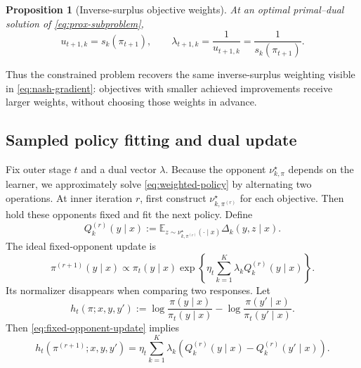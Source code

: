 \documentclass{article}
\newtheorem{proposition}{Proposition}
\theoremstyle{remark}
\theoremstyle{plain}
\newcommand{\E}{\mathbb{E}}
\begin{document}
\begin{proposition}[Inverse-surplus objective weights]
\label{prop:prox-dual}
At an optimal primal--dual solution of \eqref{eq:prox-subproblem},
\begin{equation}
u_{t+1,k}=s_k(\pi_{t+1}),
\qquad
\lambda_{t+1,k}
=\frac{1}{u_{t+1,k}}
=\frac{1}{s_k(\pi_{t+1})}.
\label{eq:kkt-weights}
\end{equation}
\end{proposition}
Thus the constrained problem recovers the same inverse-surplus weighting visible in \eqref{eq:nash-gradient}: objectives with smaller achieved improvements receive larger weights, without choosing those weights in advance.

\subsection{Sampled policy fitting and dual update}
Fix outer stage $t$ and a dual vector $\lambda$. Because the opponent $\nu^\star_{k,\pi}$ depends on the learner, we approximately solve \eqref{eq:weighted-policy} by alternating two operations. At inner iteration $r$, first construct $\nu^\star_{k,\pi^{(r)}}$ for each objective. Then hold these opponents fixed and fit the next policy. Define
\[
Q_k^{(r)}(y\mid x)
:=
\E_{z\sim\nu^\star_{k,\pi^{(r)}}(\cdot\mid x)}
\Delta_k(y,z\mid x).
\]
The ideal fixed-opponent update is
\begin{equation}
\pi^{(r+1)}(y\mid x)
\propto
\pi_t(y\mid x)
\exp\!\left\{
\eta_t\sum_{k=1}^K\lambda_kQ_k^{(r)}(y\mid x)
\right\}.
\label{eq:fixed-opponent-update}
\end{equation}
Its normalizer disappears when comparing two responses. Let
\begin{equation}
h_t(\pi;x,y,y')
:=
\log\frac{\pi(y\mid x)}{\pi_t(y\mid x)}
-
\log\frac{\pi(y'\mid x)}{\pi_t(y'\mid x)}.
\label{eq:log-ratio-change}
\end{equation}
Then \eqref{eq:fixed-opponent-update} implies
\begin{equation}
h_t(\pi^{(r+1)};x,y,y')
=
\eta_t\sum_{k=1}^K\lambda_k
\left(Q_k^{(r)}(y\mid x)-Q_k^{(r)}(y'\mid x)\right).
\label{eq:fixed-opponent-pairwise}
\end{equation}
\end{document}
